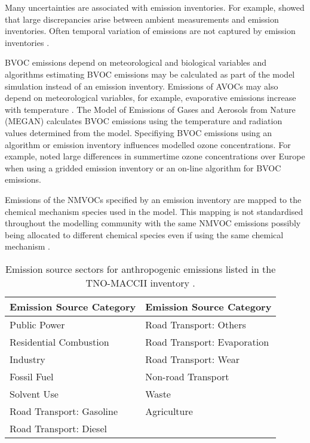 Many uncertainties are associated with emission inventories.
For example, \citet{Coll:2010} showed that large discrepancies arise between ambient measurements and emission inventories.
Often temporal variation of emissions are not captured by emission inventories \citep{Boynard:2014}. 

BVOC emissions depend on meteorological and biological variables and algorithms estimating BVOC emissions may be calculated as part of the model simulation instead of an emission inventory.
Emissions of AVOCs may also depend on meteorological variables, for example, evaporative emissions increase with temperature \citep{Rubin:2006}.
The Model of Emissions of Gases and Aerosols from Nature (MEGAN) \citep{Guenther:2006, Guenther:2012} calculates BVOC emissions using the temperature and radiation values determined from the model.
Specifiying BVOC emissions using an algorithm or emission inventory influences modelled ozone concentrations. 
For example, \citet{Curci:2009} noted large differences in summertime ozone concentrations over Europe when using a gridded emission inventory or an on-line algorithm for BVOC emissions.

Emissions of the NMVOCs specified by an emission inventory are mapped to the chemical mechanism species used in the model.
This mapping is not standardised throughout the modelling community with the same NMVOC emissions possibly being allocated to different chemical species even if using the same chemical mechanism \citep{Carter:2015}.
\begin{table}[t]%
    \centering%
    \caption[Categories of emission source sectors]{Emission source sectors for anthropogenic emissions listed in the TNO-MACCII inventory \citep{Kuenen:2014}.}%
    \begin{tabular}{ll}%
        \hline \hline
        \textbf{Emission Source Category} & \textbf{Emission Source Category} \\
        \hline \hline
        Public Power & Road Transport: Others \\
        Residential Combustion & Road Transport: Evaporation \\
        Industry & Road Transport: Wear \\
        Fossil Fuel & Non-road Transport \\
        Solvent Use & Waste \\
        Road Transport: Gasoline & Agriculture \\
        Road Transport: Diesel & \\ 
        \hline \hline
    \end{tabular}%
    \label{t:SNAP}%
\end{table}%

